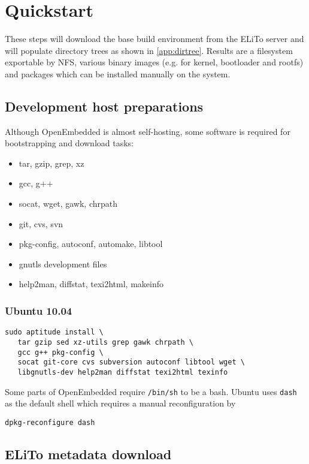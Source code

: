 \chapter{Quickstart}
\label{chap:quickstart}

These steps will download the base build environment from the ELiTo
server and will populate directory trees as shown in
\autoref{app:dirtree}. Results are a filesystem exportable by NFS,
various binary images (e.g. for kernel, bootloader and rootfs) and
packages which can be installed manually on the system.

\section{Development host preparations}

Although OpenEmbedded is almost self-hosting, some software is
required for bootstrapping and download tasks:

\begin{itemize}
\item tar, gzip, grep, xz
\item gcc, g++
\item socat, wget, gawk, chrpath
\item git, cvs, svn
\item pkg-config, autoconf, automake, libtool
\item gnutls development files
\item help2man, diffstat, texi2html, makeinfo
\end{itemize}

\subsection*{Ubuntu 10.04}
\begin{lstlisting}[language={}]
sudo aptitude install \
   tar gzip sed xz-utils grep gawk chrpath \
   gcc g++ pkg-config \
   socat git-core cvs subversion autoconf libtool wget \
   libgnutls-dev help2man diffstat texi2html texinfo
\end{lstlisting}

Some parts of OpenEmbedded require \texttt{/bin/sh} to be a bash.
Ubuntu uses \texttt{dash} as the default shell which requires a manual
reconfiguration by
\begin{lstlisting}[language={}]
dpkg-reconfigure dash
\end{lstlisting}


\section{ELiTo metadata download}
\label{subsec:quickstart_elito-download}

